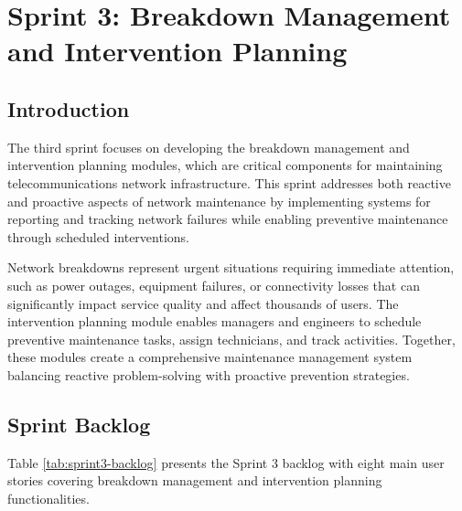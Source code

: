 \chapter{Sprint 3: Breakdown Management and Intervention Planning}

\section{Introduction}

The third sprint focuses on developing the breakdown management and intervention planning modules, which are critical components for maintaining telecommunications network infrastructure. This sprint addresses both reactive and proactive aspects of network maintenance by implementing systems for reporting and tracking network failures while enabling preventive maintenance through scheduled interventions.

Network breakdowns represent urgent situations requiring immediate attention, such as power outages, equipment failures, or connectivity losses that can significantly impact service quality and affect thousands of users. The intervention planning module enables managers and engineers to schedule preventive maintenance tasks, assign technicians, and track activities. Together, these modules create a comprehensive maintenance management system balancing reactive problem-solving with proactive prevention strategies.

\section{Sprint Backlog}

Table \ref{tab:sprint3-backlog} presents the Sprint 3 backlog with eight main user stories covering breakdown management and intervention planning functionalities.

